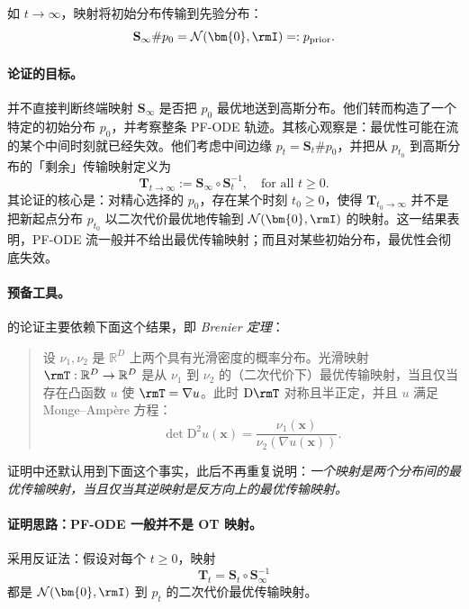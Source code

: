 如 $t \to \infty$，映射将初始分布传输到先验分布：
\[
\mathbf{S}_\infty \# p_0 = \mathcal{N}(\bm{0}, \rmI) =: p_{\text{prior}}.
\]
\paragraph{\citet{lavenant2022flow} 论证的目标。}

\citet{lavenant2022flow} 并不直接判断终端映射 $\mathbf{S}_\infty$ 是否把 $p_0$ 最优地送到高斯分布。他们转而构造了一个特定的初始分布 $p_0$，并考察整条 PF-ODE 轨迹。其核心观察是：最优性可能在流的某个中间时刻就已经失效。他们考虑中间边缘 $p_t = \mathbf{S}_t \# p_0$，并把从 $p_{t_0}$ 到高斯分布的「剩余」传输映射定义为
\[
\mathbf{T}_{t \to \infty} := \mathbf{S}_\infty \circ \mathbf{S}_{t}^{-1}, \quad \text{for all } t\geq 0.
\]
其论证的核心是：对精心选择的 $p_0$，存在某个时刻 $t_0 \geq 0$，使得 $\mathbf{T}_{t_0 \to \infty}$ 并不是把新起点分布 $p_{t_0}$ 以二次代价最优地传输到 $\mathcal{N}(\bm{0}, \rmI)$ 的映射。这一结果表明，PF-ODE 流一般并不给出最优传输映射；而且对某些初始分布，最优性会彻底失效。

\paragraph{预备工具。} \citet{lavenant2022flow} 的论证主要依赖下面这个结果，即 \emph{Brenier 定理}：
\begin{quote}
    \begin{theorem}\label{thm:brenier}
设 $\nu_1, \nu_2$ 是 $\mathbb{R}^D$ 上两个具有光滑密度的概率分布。光滑映射 $\rmT : \mathbb{R}^D \to \mathbb{R}^D$ 是从 $\nu_1$ 到 $\nu_2$ 的（二次代价下）最优传输映射，当且仅当存在凸函数 $u$ 使 $\rmT = \nabla u$。此时 $\mathrm{D} \rmT$ 对称且半正定，并且 $u$ 满足 Monge--Ampère 方程：
\[
\det \mathrm{D}^2 u(\mathbf{x}) = \frac{\nu_1(\mathbf{x})}{\nu_2(\nabla u(\mathbf{x}))}.
\]
\end{theorem}
\end{quote}

证明中还默认用到下面这个事实，此后不再重复说明：\emph{一个映射是两个分布间的最优传输映射，当且仅当其逆映射是反方向上的最优传输映射。}


\paragraph{证明思路：PF-ODE 一般并不是 OT 映射。} \citet{lavenant2022flow} 采用反证法：假设对每个 $t\ge0$，映射
\[
\mathbf{T}_t  =  \mathbf{S}_t \circ \mathbf{S}_\infty^{-1}
\]
都是 $\mathcal{N}(\bm{0},\rmI)$ 到 $p_t$ 的二次代价最优传输映射。


